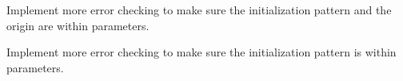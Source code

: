 
\begin{DoxyRefList}
\item[\label{todo__todo000001}%
\Hypertarget{todo__todo000001}%
File \hyperlink{gl_8c}{gl.c} ]Implement more error checking to make sure the initialization pattern and the origin are within parameters.  
\item[\label{todo__todo000002}%
\Hypertarget{todo__todo000002}%
File \hyperlink{life_8c}{life.c} ]Implement more error checking to make sure the initialization pattern is within parameters. 
\end{DoxyRefList}